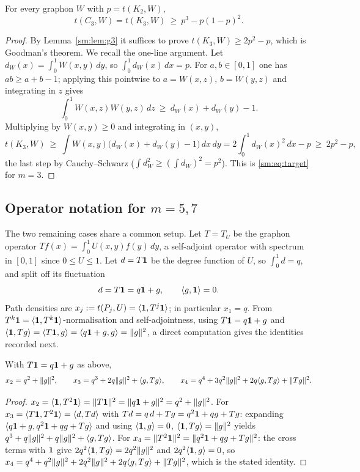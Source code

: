 \begin{theorem}\label{sm:thm:C3}
For every graphon $W$ with $p=t(K_2,W)$,
\[
        t(C_3,W)=t(K_3,W)\ \ge\ p^{3}-p(1-p)^{2}.
\]
\end{theorem}

\begin{proof}
By Lemma~\ref{sm:lem:g3} it suffices to prove $t(K_3,W)\ge 2p^2-p$, which is
Goodman's theorem.  We recall the one-line argument.  Let
$d_W(x)=\int_0^1 W(x,y)\,dy$, so $\int_0^1 d_W(x)\,dx=p$.  For
$a,b\in[0,1]$ one has $ab\ge a+b-1$; applying this pointwise to
$a=W(x,z),\,b=W(y,z)$ and integrating in $z$ gives
\[
        \int_0^1 W(x,z)W(y,z)\,dz\ \ge\ d_W(x)+d_W(y)-1 .
\]
Multiplying by $W(x,y)\ge0$ and integrating in $(x,y)$,
\[
        t(K_3,W)\ \ge\ \int W(x,y)\bigl(d_W(x)+d_W(y)-1\bigr)\,dx\,dy
        =2\!\int_0^1 d_W(x)^2\,dx-p
        \ \ge\ 2p^2-p ,
\]
the last step by Cauchy--Schwarz ($\int d_W^2\ge(\int d_W)^2=p^2$).  This is
\eqref{sm:eq:target} for $m=3$.
\end{proof}

\subsection{Operator notation for \texorpdfstring{$m=5,7$}{m=5,7}}
\label{sm:sub:ops}

The two remaining cases share a common setup.  Let $T=T_U$ be the graphon
operator $Tf(x)=\int_0^1 U(x,y)f(y)\,dy$, a self-adjoint operator with
spectrum in $[0,1]$ since $0\le U\le1$.  Let $d=T\mathbf 1$ be the degree function
of $U$, so $\int_0^1 d=q$, and split off its fluctuation
\[
        d=T\mathbf 1=q\mathbf 1+g,\qquad \langle g,\mathbf 1\rangle=0 .
\]
Path densities are $x_j:=t(P_j,U)=\langle \mathbf 1,T^{j}\mathbf 1\rangle$; in particular
$x_1=q$.  From $T^{k}\mathbf 1=\langle \mathbf 1,T^{k}\mathbf 1\rangle$-normalisation and
self-adjointness, using $T\mathbf 1=q\mathbf 1+g$ and
$\langle \mathbf 1,Tg\rangle=\langle T\mathbf 1,g\rangle=\langle q\mathbf 1+g,g\rangle=\lVert g\rVert^2$, a direct
computation gives the identities recorded next.

\begin{lemma}\label{sm:lem:moments}
With $T\mathbf 1=q\mathbf 1+g$ as above,
\[
   x_2=q^{2}+\lVert g\rVert^{2},\qquad
   x_3=q^{3}+2q\lVert g\rVert^{2}+\langle g,Tg\rangle,\qquad
   x_4=q^{4}+3q^{2}\lVert g\rVert^{2}+2q\langle g,Tg\rangle+\lVert Tg\rVert^{2}.
\]
\end{lemma}

\begin{proof}
$x_2=\langle \mathbf 1,T^2\mathbf 1\rangle=\lVert T\mathbf 1\rVert^2=\lVert q\mathbf 1+g\rVert^2=q^2+\lVert g\rVert^2$.
For $x_3=\langle T\mathbf 1,T^2\mathbf 1\rangle=\langle d,Td\rangle$ with
$Td=q\,d+Tg=q^2\mathbf 1+qg+Tg$: expanding
$\langle q\mathbf 1+g,q^2\mathbf 1+qg+Tg\rangle$ and using $\langle \mathbf 1,g\rangle=0$,
$\langle \mathbf 1,Tg\rangle=\lVert g\rVert^2$ yields
$q^3+q\lVert g\rVert^2+q\lVert g\rVert^2+\langle g,Tg\rangle$.
For $x_4=\lVert T^2\mathbf 1\rVert^2=\lVert q^2\mathbf 1+qg+Tg\rVert^2$: the cross terms with $\mathbf 1$
give $2q^2\langle \mathbf 1,Tg\rangle=2q^2\lVert g\rVert^2$ and $2q^2\langle \mathbf 1,g\rangle=0$, so
$x_4=q^4+q^2\lVert g\rVert^2+2q^2\lVert g\rVert^2+2q\langle g,Tg\rangle+\lVert Tg\rVert^2$,
which is the stated identity.
\end{proof}

